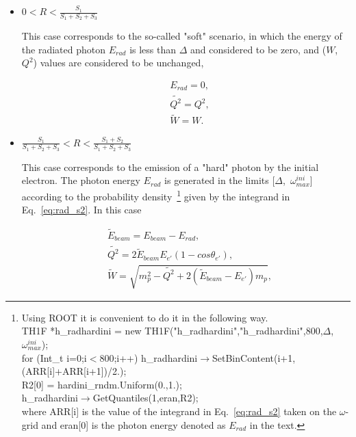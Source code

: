 \begin{itemize}

\item $0 < R < \frac{S_1}{S_1+S_2+S_3}$

This case corresponds to the so-called "soft" scenario, in which the energy of the radiated photon $E_{rad}$ is less than $\Delta$ and considered to be zero, and ($W$,~$Q^2$) values are considered to be unchanged,

\begin{equation}
\begin{aligned}
& E_{rad} = 0,\\
& \widetilde{Q^2} = Q^2,\\
& \widetilde{W} = W.
\label{eq:first_case}
\end{aligned}
\end{equation}

\item $\frac{S_1}{S_1+S_2+S_3} < R < \frac{S_1+S_2}{S_1+S_2+S_3}$

This case corresponds to the emission of a "hard" photon by the initial electron. The photon energy $E_{rad}$ is generated in the limits [$\Delta$,~$\omega_{max}^{ini}$] according to the probability density~\footnote[5]{Using ROOT it is convenient to do it in the following way.\\
TH1F *h\_radhardini = new TH1F("h\_radhardini","h\_radhardini",800,$\Delta$,$\omega_{max}^{ini}$);\\
for (Int\_t i=0;i$<$800;i++) h\_radhardini$\rightarrow$SetBinContent(i+1,(ARR[i]+ARR[i+1])/2.);\\
R2[0] = hardini\_rndm.Uniform(0.,1.);\\
h\_radhardini$\rightarrow$GetQuantiles(1,eran,R2);\\where ARR[i] is the value of the integrand in Eq.~\eqref{eq:rad_s2} taken on the $\omega$-grid and eran[0] is the photon energy denoted as $E_{rad}$ in the text. } given by the integrand in Eq.~\eqref{eq:rad_s2}. In this case

\begin{equation}
\begin{aligned}
& \widetilde{E}_{beam} = E_{beam} - E_{rad},\\
& \widetilde{Q^2} = 2\widetilde{E}_{beam}E_{e'}(1 - cos\theta_{e'}),\\
& \widetilde{W} = \sqrt{m_{p}^{2} - \widetilde{Q^2} + 2(\widetilde{E}_{beam} - E_{e'})m_{p}},
\label{eq:2nd_case}
\end{aligned}
\end{equation}


\end{itemize}
